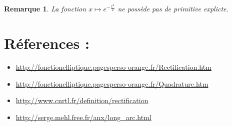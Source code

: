 \documentclass[11pt,a4paper,french]{article}
\theoremstyle{break}
\theoremstyle{plain}
\theoremstyle{nonumberplain}
\newtheorem{remarque}{Remarque}
\theoremstyle{nonumberbreak}
\begin{document}
\begin{remarque}
  La fonction $x\mapsto e^{-\frac{x^2}2}$ ne possède pas de primitive
  explicte.
\end{remarque}

\section*{Réferences :}

\begin{itemize}
  \item \url{http://fonctionelliptique.pagesperso-orange.fr/Rectification.htm}
  \item \url{http://fonctionelliptique.pagesperso-orange.fr/Quadrature.htm}
  \item \url{http://www.cnrtl.fr/definition/rectification}
  \item \url{http://serge.mehl.free.fr/anx/long_arc.html}
\end{itemize}
\end{document}
